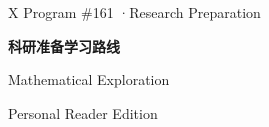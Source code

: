 \documentclass[10pt,a4paper]{article}
\begin{document}
\hypersetup{pageanchor=false}
\begin{titlepage}
\thispagestyle{empty}
\vspace*{.23\textheight}
{\Large X Program \#161 \enspace·\enspace Research Preparation\par}
\vspace{9mm}
{\fontsize{32}{39}\selectfont\bfseries 科研准备学习路线\par}
\vspace{5mm}
{\large Mathematical Exploration\par}
{\large Personal Reader Edition\par}
\vfill
\end{titlepage}
\hypersetup{pageanchor=true}

\begingroup
\setlength{\parskip}{1.7pt plus 0.4pt minus 0.3pt}
\tableofcontents
\endgroup
\clearpage
{}

\clearpage

\clearpage

\clearpage

\end{document}
